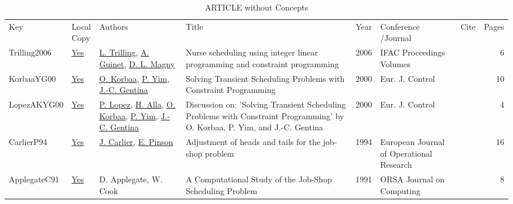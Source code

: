 {\scriptsize
\begin{longtable}{llp{5cm}p{10cm}rp{3cm}lr}
\rowcolor{white}\caption{ARTICLE without Concepts}\\ \toprule
\rowcolor{white}Key & \shortstack{Local\\Copy} & Authors & Title & Year & \shortstack{Conference\\/Journal} & Cite & Pages\\ \midrule
\endhead
\bottomrule
\endfoot
Trilling2006 & \href{../scheduling/works/Trilling2006.pdf}{Yes} & \hyperref[auth:a1654]{L. Trilling}, \hyperref[auth:a1655]{A. Guinet}, \hyperref[auth:a1656]{D. L. Magny} & Nurse scheduling using integer linear programming and constraint programming & 2006 & IFAC Proceedings Volumes & \cite{Trilling2006} & 6\\KorbaaYG00 & \href{../scheduling/works/KorbaaYG00.pdf}{Yes} & \hyperref[auth:a679]{O. Korbaa}, \hyperref[auth:a680]{P. Yim}, \hyperref[auth:a681]{J.-C. Gentina} & Solving Transient Scheduling Problems with Constraint Programming & 2000 & Eur. J. Control & \cite{KorbaaYG00} & 10\\LopezAKYG00 & \href{../scheduling/works/LopezAKYG00.pdf}{Yes} & \hyperref[auth:a3]{P. Lopez}, \hyperref[auth:a682]{H. Alla}, \hyperref[auth:a679]{O. Korbaa}, \hyperref[auth:a680]{P. Yim}, \hyperref[auth:a681]{J.-C. Gentina} & Discussion on: 'Solving Transient Scheduling Problems with Constraint Programming' by O. Korbaa, P. Yim, and {J.-C.} Gentina & 2000 & Eur. J. Control & \cite{LopezAKYG00} & 4\\CarlierP94 & \href{../scheduling/works/CarlierP94.pdf}{Yes} & \hyperref[auth:a844]{J. Carlier}, \hyperref[auth:a845]{E. Pinson} & Adjustment of heads and tails for the job-shop problem & 1994 & European Journal of Operational Research & \cite{CarlierP94} & 16\\ApplegateC91 & \href{../scheduling/works/ApplegateC91.pdf}{Yes} & D. Applegate, W. Cook & A Computational Study of the Job-Shop Scheduling Problem & 1991 & ORSA Journal on Computing & \cite{ApplegateC91} & 8\\\end{longtable}
}

